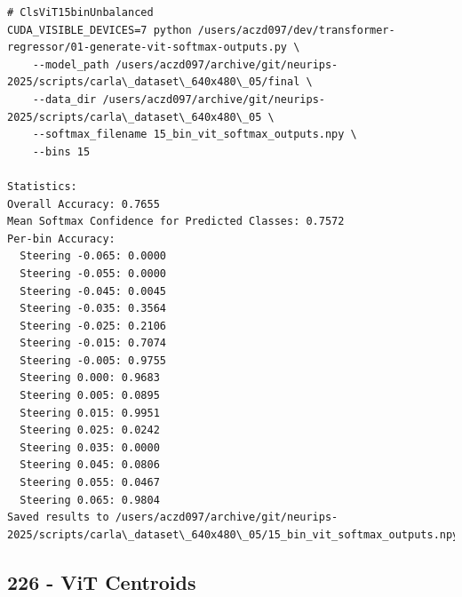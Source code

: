 \begin{verbatim}
# ClsViT15binUnbalanced
CUDA_VISIBLE_DEVICES=7 python /users/aczd097/dev/transformer-regressor/01-generate-vit-softmax-outputs.py \
    --model_path /users/aczd097/archive/git/neurips-2025/scripts/carla\_dataset\_640x480\_05/final \
    --data_dir /users/aczd097/archive/git/neurips-2025/scripts/carla\_dataset\_640x480\_05 \
    --softmax_filename 15_bin_vit_softmax_outputs.npy \
    --bins 15      
    
Statistics:
Overall Accuracy: 0.7655
Mean Softmax Confidence for Predicted Classes: 0.7572
Per-bin Accuracy:
  Steering -0.065: 0.0000
  Steering -0.055: 0.0000
  Steering -0.045: 0.0045
  Steering -0.035: 0.3564
  Steering -0.025: 0.2106
  Steering -0.015: 0.7074
  Steering -0.005: 0.9755
  Steering 0.000: 0.9683
  Steering 0.005: 0.0895
  Steering 0.015: 0.9951
  Steering 0.025: 0.0242
  Steering 0.035: 0.0000
  Steering 0.045: 0.0806
  Steering 0.055: 0.0467
  Steering 0.065: 0.9804
Saved results to /users/aczd097/archive/git/neurips-2025/scripts/carla\_dataset\_640x480\_05/15_bin_vit_softmax_outputs.npy

\end{verbatim}

\subsection{226 - ViT Centroids}
\label{app_res:226}

